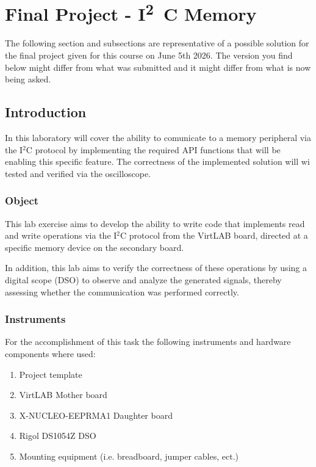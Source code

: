 \documentclass[../main.tex]{subfiles}
\begin{document}
\clearpage
\thispagestyle{empty}

\vspace*{7cm}
\section{Final Project - \unit{I^2C} Memory}
\vspace*{1.5cm}

The following section and subsections are representative of a possible solution for the final project given for this course on June 5th 2026.
The version you find below might differ from what was submitted and it might differ from what is now being asked. 

\vspace*{1.cm}
\subsection{Introduction}

In this laboratory will cover the ability to comunicate to a memory peripheral via the I$^2$C protocol by implementing the required API functions that will be enabling this specific feature. The correctness of the implemented solution will wi tested and verified via the oscilloscope.

\subsubsection*{Object}

This lab exercise aims to develop the ability to write code that implements read and write operations via the I$^2$C protocol from the VirtLAB board, directed at a specific memory device on the secondary board.

In addition, this lab aims to verify the correctness of these operations by using a digital scope (DSO) to observe and analyze the generated signals, thereby assessing whether the communication was performed correctly.

\subsubsection*{Instruments} 

For the accomplishment of this task the following instruments and hardware components where used:

\begin{enumerate}[label=\textbf{-}]
	\item Project template
	\item VirtLAB Mother board
	\item X-NUCLEO-EEPRMA1 Daughter board
	\item Rigol DS1054Z DSO
	\item Mounting equipment (i.e. breadboard, jumper cables, ect.)
\end{enumerate}
	
\end{document}
